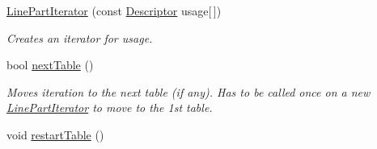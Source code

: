 \begin{DoxyCompactItemize}
\item 
\hypertarget{classxmem_1_1config_1_1third__party_1_1_print_usage_implementation_1_1_line_part_iterator_affaa574a17d4cbc561d6281cc379641f}{\hyperlink{classxmem_1_1config_1_1third__party_1_1_print_usage_implementation_1_1_line_part_iterator_affaa574a17d4cbc561d6281cc379641f}{Line\-Part\-Iterator} (const \hyperlink{structxmem_1_1config_1_1third__party_1_1_descriptor}{Descriptor} usage\mbox{[}$\,$\mbox{]})}\label{classxmem_1_1config_1_1third__party_1_1_print_usage_implementation_1_1_line_part_iterator_affaa574a17d4cbc561d6281cc379641f}

\begin{DoxyCompactList}\small\item\em Creates an iterator for {\ttfamily usage}. \end{DoxyCompactList}\item 
bool \hyperlink{classxmem_1_1config_1_1third__party_1_1_print_usage_implementation_1_1_line_part_iterator_a8c9cebd37c34729868760e6b85d00230}{next\-Table} ()
\begin{DoxyCompactList}\small\item\em Moves iteration to the next table (if any). Has to be called once on a new \hyperlink{classxmem_1_1config_1_1third__party_1_1_print_usage_implementation_1_1_line_part_iterator}{Line\-Part\-Iterator} to move to the 1st table. \end{DoxyCompactList}\item 
\hypertarget{classxmem_1_1config_1_1third__party_1_1_print_usage_implementation_1_1_line_part_iterator_af02074920bfd407cc7a871a7b0edf5af}{void \hyperlink{classxmem_1_1config_1_1third__party_1_1_print_usage_implementation_1_1_line_part_iterator_af02074920bfd407cc7a871a7b0edf5af}{restart\-Table} ()}\label{classxmem_1_1config_1_1third__party_1_1_print_usage_implementation_1_1_line_part_iterator_af02074920bfd407cc7a871a7b0edf5af}


\end{DoxyCompactItemize}
